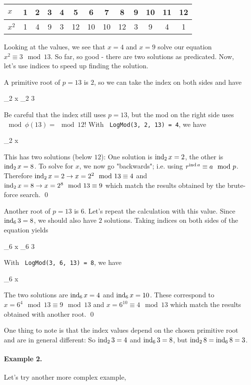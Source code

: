 \begin{tabular}{lcccccccccccc}
    $x$   & 1 & 2 & 3 & 4 & 5  & 6  & 7  & 8  & 9 & 10 & 11 & 12 \\ \hline
    $x^2$ & 1 & 4 & 9 & 3 & 12 & 10 & 10 & 12 & 3 & 9  & 4  & 1 
\end{tabular}

\vspace{2mm}

Looking at the values, we see that $x = 4$ and $x = 9$ solve our equation $x^2 \equiv 3 \mod 13$. So far, so good - there are two solutions as predicated. Now, let's use indices to speed up finding the solution.

A primitive root of $p=13$ is $2$, so we can take the index on both sides and have

 \ind_2 x \equiv \ind_2 3 
\eee

Be careful that the index still uses $p=13$, but the mod on the right side uses $\mod \phi(13) = \mod 12$! With \verb+ LogMod(3, 2, 13) = 4+, we have

 \ind_2 x  
\eee

This has two solutions (below $12$): One solution is $\operatorname{ind}_2 x = 2$, the other is $\operatorname{ind}_2 x = 8$. To solve for $x$, we now go "backwards"; i.e. using $r^{\operatorname{ind} a} \equiv a \mod p$. Therefore $\operatorname{ind}_2 x = 2 \rightarrow x = 2^2 \mod 13 \equiv 4$ and $\operatorname{ind}_2 x = 8 \rightarrow x = 2^8 \mod 13 \equiv 9$ which match the results obtained by the brute-force search. \qed

Another root of $p=13$ is $6$. Let's repeat the calculation with this value. Since $\operatorname{ind}_6 3 = 8$, we should also have $2$ solutions. Taking indices on both sides of the equation yields

 \ind_6 x \equiv \ind_6 3 
\eee

With \verb+ LogMod(3, 6, 13) = 8+, we have

 \ind_6 x  
\eee

The two solutions are $\operatorname{ind}_6 x = 4$ and $\operatorname{ind}_6 x = 10$. These correspond to $x = 6^4 \mod 13 \equiv 9 \mod 13$ and $x = 6^{10} \equiv 4 \mod 13$ which match the results obtained with another root. \qed

One thing to note is that the index values depend on the chosen primitive root and are in general different: So $\operatorname{ind}_2 3 = 4$ and $\operatorname{ind}_6 3 = 8$, but $\operatorname{ind}_2 8 = \operatorname{ind}_6 8 = 3$.

\paragraph{Example 2.} Let's try another more complex example,

